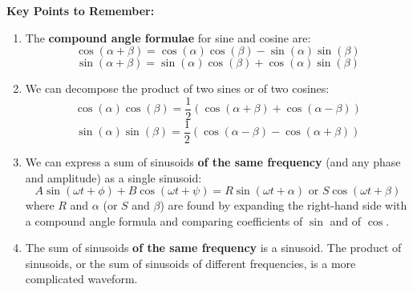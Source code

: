 \documentclass{article}
\begin{document}
\clearpage


\textbf{Key Points to Remember:}

\begin{enumerate}
\item The \textbf{compound angle formulae} for sine and cosine are:
	\[\cos(\alpha+\beta)=\cos(\alpha)\cos(\beta)-\sin(\alpha)\sin(\beta)\]
	\[\sin(\alpha+\beta)=\sin(\alpha)\cos(\beta)+\cos(\alpha)\sin(\beta)\]
\item We can decompose the product of two sines or of two cosines:
	\[\cos(\alpha)\cos(\beta)=\frac{1}{2}\left(\cos(\alpha+\beta)+\cos(\alpha-\beta)\right)\]
	\[\sin(\alpha)\sin(\beta) = \frac{1}{2}\left(\cos(\alpha-\beta)-\cos(\alpha+\beta)\right)\]
\item We can express a sum of sinusoids \textbf{of the same frequency} (and any phase and amplitude) as a single sinusoid:
	\[A\sin(\omega t+\phi)+B\cos(\omega t+\psi) = R\sin(\omega t+\alpha) \mbox{ or } S\cos(\omega t+\beta)\]
	where	$R$ and $\alpha$ (or $S$ and $\beta$) are found by expanding the right-hand side with a compound angle formula and comparing coefficients of $\sin$ and of $\cos$.
\item The sum of sinusoids \textbf{of the same frequency} is a sinusoid. The product of sinusoids, or the sum of sinusoids of different frequencies, is a more complicated waveform.
\end{enumerate}
\end{document}
